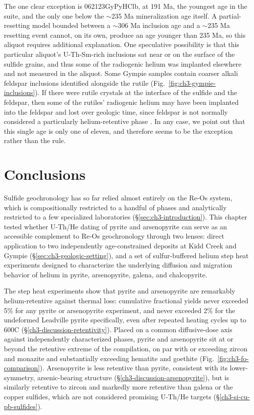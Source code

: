 The one clear exception is 062123GyPyHClb, at 191 Ma, the youngest age
in the suite, and the only one below the $\sim$235 Ma mineralization age
itself. A partial-resetting model bounded between a $\sim$306 Ma
inclusion age and a $\sim$235 Ma resetting event cannot, on its own,
produce an age younger than 235 Ma, so this aliquot requires
additional explanation. One speculative possibility is that this particular aliquot's U-Th-Sm-rich 
inclusions sat near or on the surface of the sulfide grains, and thus some of the radiogenic helium was implanted elsewhere and not measured in the aliquot.
Some Gympie samples contain coarser alkali feldspar inclusions identified alongside the rutile
(Fig.~\ref{fig:ch3-gympie-inclusions}). If there were rutile crystals at the interface of the sulfide and the feldspar, then some 
of the rutiles' radiogenic helium may have been implanted into the feldspar and lost over geologic time, since feldspar is not normally considered a
particularly helium-retentive phase \citep{hurley1941}. In any case, we point out that this single age is only one of eleven, and therefore seems to be the exception rather than the rule.

\section{Conclusions}\label{sec:ch3-conclusions}

Sulfide geochronology has so far relied almost entirely on the Re-Os
system, which is compositionally restricted to a handful of phases and
analytically restricted to a few specialized laboratories
(\S\ref{sec:ch3-introduction}). This chapter tested whether U-Th/He
dating of pyrite and arsenopyrite can serve as an accessible complement to Re-Os geochronology
through two lenses: direct application to two independently
age-constrained deposits at Kidd Creek and Gympie
(\S\ref{sec:ch3-geologic-setting}), and a set of sulfur-buffered helium
step heat experiments designed to characterize the underlying
diffusion and migration behavior of helium in pyrite, arsenopyrite, galena, and chalcopyrite.

The step heat experiments show that pyrite and arsenopyrite are
remarkably helium-retentive against thermal loss: cumulative fractional yields never
exceeded 5\% for any pyrite or arsenopyrite experiment, and never
exceeded 2\% for the undeformed Leadville pyrite
specifically, even after repeated heating cycles up to 600\textdegree C 
(\S\ref{ch3-discussion-retentivity}). Placed on a common diffusive-dose
axis against independently characterized phases, pyrite and arsenopyrite
sit at or beyond the retentive extreme of the compilation, on par with
or exceeding zircon and monazite and substantially exceeding hematite
and goethite (Fig.~\ref{fig:ch3-fo-comparison}). Arsenopyrite is less
retentive than pyrite, consistent with its lower-symmetry,
arsenic-bearing structure (\S\ref{ch3-discussion-arsenopyrite}), but is similarly retentive to zircon and
markedly more retentive than galena or the copper sulfides,
which are not considered promising U-Th/He targets (\S\ref{ch3-si-cu-pb-sulfides}).

